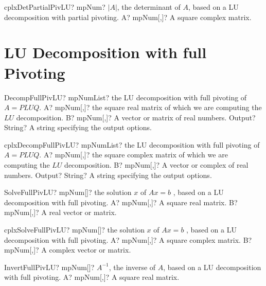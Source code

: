 \documentclass[12pt,a4paper,openany]{book}
\begin{document}
\begin{mpFunctionsExtract}
\mpFunctionOne
{cplxDetPartialPivLU? mpNum? $|A|$, the determinant of $A$, based on a LU decomposition with partial pivoting.}
{A? mpNum[,]? A square complex matrix.}
\end{mpFunctionsExtract}

\section{LU Decomposition with full Pivoting}

\begin{mpFunctionsExtract}
\mpFunctionThree
{DecompFullPivLU? mpNumList? the LU decomposition with full pivoting of $A = PLUQ$.}
{A? mpNum[,]? the square real matrix of which we are computing the $LU$ decomposition.}
{B? mpNum[,]? A vector or matrix of real numbers.}
{Output? String? A string specifying the output options.}
\end{mpFunctionsExtract}

\begin{mpFunctionsExtract}
\mpFunctionThree
{cplxDecompFullPivLU? mpNumList? the LU decomposition with full pivoting of $A = PLUQ$.}
{A? mpNum[,]? the square complex matrix of which we are computing the $LU$ decomposition.}
{B? mpNum[,]? A vector or complex of real numbers.}
{Output? String? A string specifying the output options.}
\end{mpFunctionsExtract}

\begin{mpFunctionsExtract}
\mpFunctionTwo
{SolveFullPivLU? mpNum[]? the solution $x$ of $A x = b$ , based on a LU decomposition with full pivoting.}
{A? mpNum[,]? A square real matrix.}
{B? mpNum[,]? A real vector or matrix.}
\end{mpFunctionsExtract}

\begin{mpFunctionsExtract}
\mpFunctionTwo
{cplxSolveFullPivLU? mpNum[]? the solution $x$ of $A x = b$ , based on a LU decomposition with full pivoting.}
{A? mpNum[,]? A square complex matrix.}
{B? mpNum[,]? A complex vector or matrix.}
\end{mpFunctionsExtract}

\begin{mpFunctionsExtract}
\mpFunctionOne
{InvertFullPivLU? mpNum[]? $A^{-1}$, the inverse of $A$, based on a LU decomposition with full pivoting.}
{A? mpNum[,]? A square real matrix.}
\end{mpFunctionsExtract}
\end{document}
